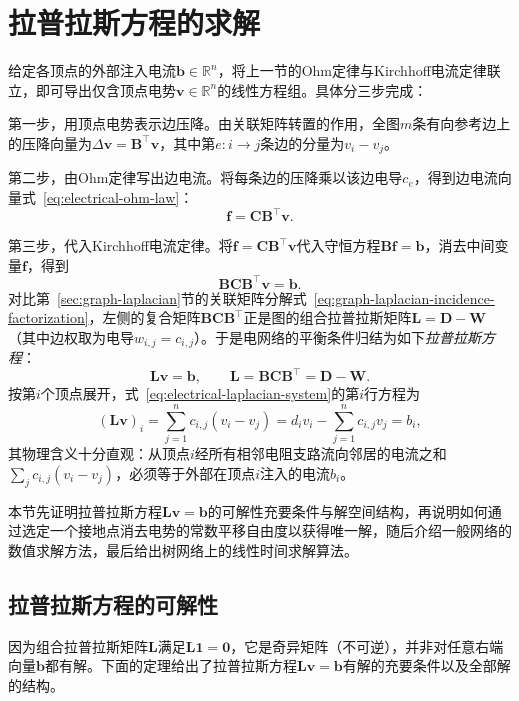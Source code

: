 \section{拉普拉斯方程的求解}
\label{sec:graph-laplacian-solve}

给定各顶点的外部注入电流$\bm b\in\mathbb R^n$，将上一节的Ohm定律与Kirchhoff电流定律联立，即可导出仅含顶点电势$\bm v\in\mathbb R^n$的线性方程组。具体分三步完成：

第一步，用顶点电势表示边压降。由关联矩阵转置的作用，全图$m$条有向参考边上的压降向量为$\Delta\bm v = \bm B^\top\bm v$，其中第$e\colon i\to j$条边的分量为$v_i - v_j$。

第二步，由Ohm定律写出边电流。将每条边的压降乘以该边电导$c_e$，得到边电流向量式~\eqref{eq:electrical-ohm-law}：
\[
  \bm f = \bm C\bm B^\top\bm v.
\]

第三步，代入Kirchhoff电流定律。将$\bm f = \bm C\bm B^\top\bm v$代入守恒方程$\bm B\bm f = \bm b$，消去中间变量$\bm f$，得到
\[
  \bm B\bm C\bm B^\top\bm v = \bm b.
\]
对比第~\ref{sec:graph-laplacian}节的关联矩阵分解式~\eqref{eq:graph-laplacian-incidence-factorization}，左侧的复合矩阵$\bm B\bm C\bm B^\top$正是图的组合拉普拉斯矩阵$\bm L=\bm D-\bm W$（其中边权取为电导$w_{i,j}=c_{i,j}$）。于是电网络的平衡条件归结为如下\emph{拉普拉斯方程}：
\begin{equation}
  \bm L\bm v = \bm b, \qquad \bm L = \bm B\bm C\bm B^\top = \bm D - \bm W.
  \label{eq:electrical-laplacian-system}
\end{equation}
按第$i$个顶点展开，式~\eqref{eq:electrical-laplacian-system}的第$i$行方程为
\[
  (\bm L\bm v)_i = \sum_{j=1}^n c_{i,j}(v_i - v_j) = d_i v_i - \sum_{j=1}^n c_{i,j}v_j = b_i,
\]
其物理含义十分直观：从顶点$i$经所有相邻电阻支路流向邻居的电流之和$\sum_j c_{i,j}(v_i-v_j)$，必须等于外部在顶点$i$注入的电流$b_i$。

本节先证明拉普拉斯方程$\bm L\bm v=\bm b$的可解性充要条件与解空间结构，再说明如何通过选定一个接地点消去电势的常数平移自由度以获得唯一解，随后介绍一般网络的数值求解方法，最后给出树网络上的线性时间求解算法。

\subsection{拉普拉斯方程的可解性}
\label{sec:electrical-laplacian-derivation}

因为组合拉普拉斯矩阵$\bm L$满足$\bm L\bm 1=\bm 0$，它是奇异矩阵（不可逆），并非对任意右端向量$\bm b$都有解。下面的定理给出了拉普拉斯方程$\bm L\bm v=\bm b$有解的充要条件以及全部解的结构。

